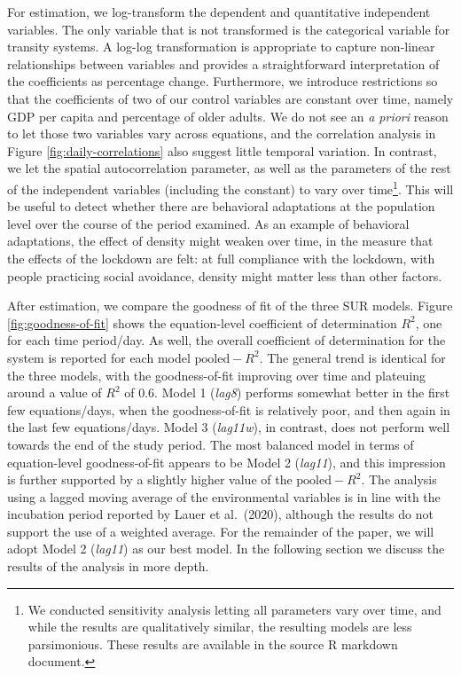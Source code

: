 \documentclass[]{elsarticle} %
\begin{document}
For estimation, we log-transform the dependent and quantitative
independent variables. The only variable that is not transformed is the
categorical variable for transity systems. A log-log transformation is
appropriate to capture non-linear relationships between variables and
provides a straightforward interpretation of the coefficients as
percentage change. Furthermore, we introduce restrictions so that the
coefficients of two of our control variables are constant over time,
namely GDP per capita and percentage of older adults. We do not see an
\emph{a priori} reason to let those two variables vary across equations,
and the correlation analysis in Figure \ref{fig:daily-correlations} also
suggest little temporal variation. In contrast, we let the spatial
autocorrelation parameter, as well as the parameters of the rest of the
independent variables (including the constant) to vary over
time\footnote{We conducted sensitivity analysis letting all parameters vary over time, and while the results are qualitatively similar, the resulting models are less parsimonious. These results are available in the source R markdown document.}.
This will be useful to detect whether there are behavioral adaptations
at the population level over the course of the period examined. As an
example of behavioral adaptations, the effect of density might weaken
over time, in the measure that the effects of the lockdown are felt: at
full compliance with the lockdown, with people practicing social
avoidance, density might matter less than other factors.

After estimation, we compare the goodness of fit of the three SUR
models. Figure \ref{fig:goodness-of-fit} shows the equation-level
coefficient of determination \(R^2\), one for each time period/day. As
well, the overall coefficient of determination for the system is
reported for each model \(\text{pooled}-R^2\). The general trend is
identical for the three models, with the goodness-of-fit improving over
time and plateuing around a value of \(R^2\) of 0.6. Model 1
(\emph{lag8}) performs somewhat better in the first few equations/days,
when the goodness-of-fit is relatively poor, and then again in the last
few equations/days. Model 3 (\emph{lag11w}), in contrast, does not
perform well towards the end of the study period. The most balanced
model in terms of equation-level goodness-of-fit appears to be Model 2
(\emph{lag11}), and this impression is further supported by a slightly
higher value of the \(\text{pooled}-R^2\). The analysis using a lagged
moving average of the environmental variables is in line with the
incubation period reported by Lauer et al.~(2020), although the results
do not support the use of a weighted average. For the remainder of the
paper, we will adopt Model 2 (\emph{lag11}) as our best model. In the
following section we discuss the results of the analysis in more depth.
\end{document}
